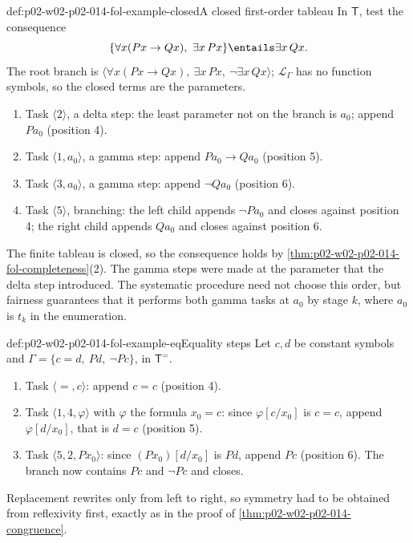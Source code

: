 \begin{hbexample}{def:p02-w02-p02-014-fol-example-closed}{A closed first-order tableau}
In \(\mathsf T\), test the consequence
\[
  \{\forall x(Px\to Qx),\ \exists x\,Px\}\entails\exists x\,Qx .
\]
The root branch is
\(\langle\forall x(Px\to Qx),\ \exists x\,Px,\ \neg\exists x\,Qx\rangle\);
\(\mathcal L_{\Gamma}\) has no function symbols, so the closed terms are the
parameters.
\begin{enumerate}
  \item Task \(\langle 2\rangle\), a delta step: the least parameter not on
        the branch is \(a_0\); append \(Pa_0\) (position 4).
  \item Task \(\langle 1,a_0\rangle\), a gamma step: append
        \(Pa_0\to Qa_0\) (position 5).
  \item Task \(\langle 3,a_0\rangle\), a gamma step: append \(\neg Qa_0\)
        (position 6).
  \item Task \(\langle 5\rangle\), branching: the left child appends
        \(\neg Pa_0\) and closes against position 4; the right child
        appends \(Qa_0\) and closes against position 6.
\end{enumerate}
The finite tableau is closed, so the consequence holds by
\cref{thm:p02-w02-p02-014-fol-completeness}(2).  The gamma steps were made at
the parameter that the delta step introduced.  The systematic procedure
need not choose this order, but fairness guarantees that it performs both
gamma tasks at \(a_0\) by stage \(k\), where \(a_0\) is \(t_k\) in the
enumeration.
\end{hbexample}

\begin{hbexample}{def:p02-w02-p02-014-fol-example-eq}{Equality steps}
Let \(c,d\) be constant symbols and \(\Gamma=\{c=d,\ Pd,\ \neg Pc\}\), in
\(\mathsf T^{=}\).
\begin{enumerate}
  \item Task \(\langle{=},c\rangle\): append \(c=c\) (position 4).
  \item Task \(\langle 1,4,\varphi\rangle\) with \(\varphi\) the formula
        \(x_0=c\): since \(\varphi[c/x_0]\) is \(c=c\), append
        \(\varphi[d/x_0]\), that is \(d=c\) (position 5).
  \item Task \(\langle 5,2,Px_0\rangle\): since \((Px_0)[d/x_0]\) is \(Pd\),
        append \(Pc\) (position 6).  The branch now contains \(Pc\) and
        \(\neg Pc\) and closes.
\end{enumerate}
Replacement rewrites only from left to right, so symmetry had to be
obtained from reflexivity first, exactly as in the proof of
\cref{thm:p02-w02-p02-014-congruence}.
\end{hbexample}

